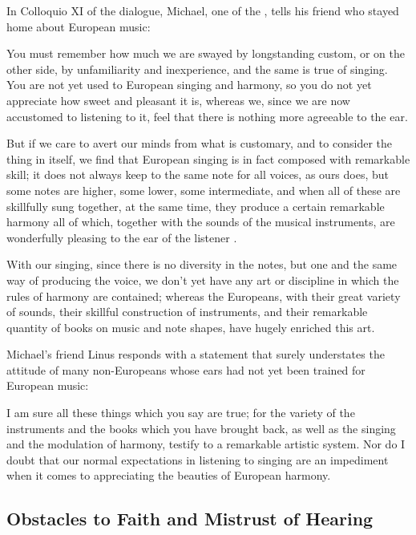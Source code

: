 In Colloquio XI of the dialogue, Michael, one of the , tells
his friend who stayed home about European music:
\begin{quoting}
    You must remember \Dots{} how much we are swayed by longstanding custom, or
    on the other side, by unfamiliarity and inexperience, and the same is true
    of singing.
    You are not yet used to European singing and harmony, so you do not yet
    appreciate how sweet and pleasant it is, whereas we, since we are now
    accustomed to listening to it, feel that there is nothing more agreeable to
    the ear.

    But if we care to avert our minds from what is customary, and to consider
    the thing in itself, we find that European singing is in fact composed with
    remarkable skill; it does not always keep to the same note for all voices,
    as ours does, but some notes are higher, some lower, some intermediate, and
    when all of these are skillfully sung together, at the same time, they
    produce a certain remarkable harmony \Dots{} all of which, \Dots{} together
    with the sounds of the musical instruments, are wonderfully pleasing to the
    ear of the listener \Dots{}.

    With our singing, since there is no diversity in the notes, but one and the
    same way of producing the voice, we don't yet have any art or discipline in
    which the rules of harmony are contained; whereas the Europeans, with their
    great variety of sounds, their skillful construction of instruments, and
    their remarkable quantity of books on music and note shapes, have hugely
    enriched this art.%
        \Autocite[155-156]{Massarella:JapaneseTravellers}
\end{quoting}
Michael's friend Linus responds with a statement that surely understates the
attitude of many non-Europeans whose ears had not yet been trained for European
music:
\begin{quoting}
    I am sure all these things which you say are true; for the variety of the
    instruments and the books which you have brought back, as well as the
    singing and the modulation of harmony, testify to a remarkable artistic
    system.
    Nor do I doubt that our normal expectations in listening to singing are an
    impediment when it comes to appreciating the beauties of European harmony.%
        \Autocite[156]{Massarella:JapaneseTravellers}
\end{quoting}


\subsection{Obstacles to Faith and Mistrust of Hearing}

